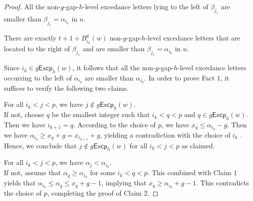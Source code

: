 \documentclass[12pt]{article}
\numberwithin{equation}{section}
\theoremstyle{plain}
\def\Excp{\mathsf{Excp}}
\begin{document}
\begin{proof}
 All the non-$g$-gap-$h$-level excedance letters lying  to the left of $\beta_{j_{1}}$ are smaller than    $\beta_{j_{1}}=\alpha_{i_k}$ in $u$.
 
   There are exactly $t+1+B^g_{i_k}(w)$ non-$g$-gap-$h$-level excedance letters that are located to the right of $\beta_{j_{1}}$ and   are smaller than  $\beta_{j_{1}}=\alpha_{i_k}$ in $u$.
  
 
  Since $i_k\in g\Excp_{h}(w)$,  it follows that all the non-$g$-gap-$h$-level excedance letters occurring  to the left of $\alpha_{i_{k}}$  are smaller than $\alpha_{i_k}$.  In order to prove Fact $1$, it suffices  to verify the following two claims. 
  
   For all $i_k<j<p$, we have $j\notin g\Excp_h(w)$.\\
   If not,  choose $q$ be the smallest  integer such that $i_k<q<p$ and 
  $q\in g\Excp_h(w)$.  Then we have $i_{k+1}=q$. According to the choice of $p$, we have $x_q\leq \alpha_{i_k}-g$. Then we have $\alpha_{i_k}\geq x_q+g=x_{i_{k+1}}+g$,  yielding a contradiction with the choice of $i_k$ .  Hence, we conclude that $j\notin g\Excp_{h}(w)$ for all $i_k<j<p$ as claimed.
  
   For all  $i_k<j<p$, we have $\alpha_j< \alpha_{i_k}$. \\
  If not, assume that $\alpha_q\geq \alpha_{i_k}$ for some $i_k<q<p$.  This combined with Claim  $1$ yields that  $\alpha_{i_k}\leq \alpha_q\leq x_{q}+g-1$, implying  that $x_q\geq \alpha_{i_k}+g-1$. This contradicts     the choice of $p$, completing  the proof of Claim $2$. 
  

\end{proof}
\end{document}
